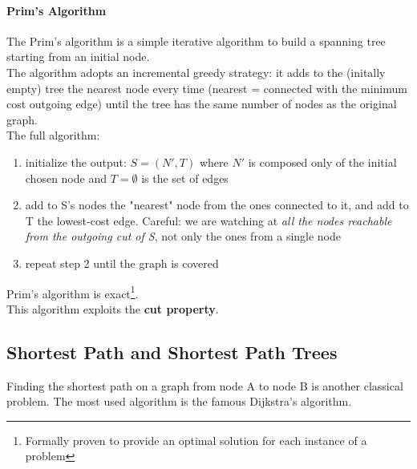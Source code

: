 \documentclass{article}
\begin{document}
			\paragraph{Prim's Algorithm}
				The Prim's algorithm is a simple iterative algorithm to build a spanning tree starting from an initial node.\\
				The algorithm adopts an incremental greedy strategy: it adds to the (initally empty) tree the nearest node every time (nearest = connected with the minimum cost outgoing edge) until the tree has the same number of nodes as the original graph.\\
				The full algorithm:
				\begin{enumerate}
					\item initialize the output: $S = (N', T)$ where $N'$ is composed only of the initial chosen node and $T = \emptyset$ is the set of edges
					\item add to S's nodes the "nearest" node from the ones connected to it, and add to T the lowest-cost edge. Careful: we are watching at \textit{all the nodes reachable from the outgoing cut of S}, not only the ones from a single node
					\item repeat step 2 until the graph is covered
				\end{enumerate}
				Prim's algorithm is exact\footnote{Formally proven to provide an optimal solution for each instance of a problem}.\\
				This algorithm exploits the \textbf{cut property}.

		\subsection{Shortest Path and Shortest Path Trees}
			Finding the shortest path on a graph from node A to node B is another classical problem. The most used algorithm is the famous Dijkstra's algorithm.
\end{document}
